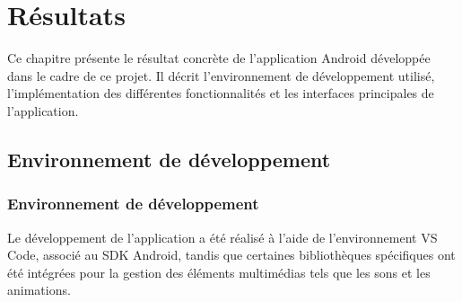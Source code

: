\documentclass[a4paper,oneside,12pt]{book}
\begin{document}
	


	






















\chapter{Résultats}\label{chap4}

Ce chapitre présente le résultat concrète de l'application Android développée dans le cadre de ce projet. Il décrit l'environnement de développement utilisé, l'implémentation des différentes fonctionnalités et les interfaces principales de l'application.

\section{Environnement de développement  }
\subsection{Environnement de développement}
Le développement de l'application a été réalisé à l'aide de l'environnement VS Code, associé au SDK Android, tandis que certaines bibliothèques spécifiques ont été intégrées pour la gestion des éléments multimédias tels que les sons et les animations.
\end{document}
